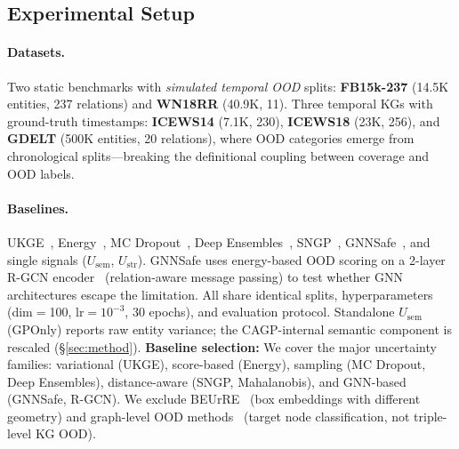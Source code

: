
\subsection{Experimental Setup}

\paragraph{Datasets.}
Two static benchmarks with \emph{simulated temporal OOD} splits: \textbf{FB15k-237} (14.5K entities, 237 relations) and \textbf{WN18RR} (40.9K, 11). Three temporal KGs with ground-truth timestamps: \textbf{ICEWS14} (7.1K, 230), \textbf{ICEWS18} (23K, 256), and \textbf{GDELT} (500K entities, 20 relations), where OOD categories emerge from chronological splits---breaking the definitional coupling between coverage and OOD labels.

\paragraph{Baselines.}
UKGE~\citep{chen2019embedding}, Energy~\citep{liu2020energy}, MC Dropout~\citep{gal2016dropout}, Deep Ensembles~\citep{lakshminarayanan2017simple}, SNGP~\citep{liu2020simple}, GNNSafe~\citep{wu2023energy}, and single signals ($U_{\text{sem}}$, $U_{\text{str}}$). GNNSafe uses energy-based OOD scoring on a 2-layer R-GCN encoder~\citep{schlichtkrull2018modeling} (relation-aware message passing) to test whether GNN architectures escape the limitation. All share identical splits, hyperparameters (dim$=$100, lr$=10^{-3}$, 30 epochs), and evaluation protocol. Standalone $U_{\text{sem}}$ (GPOnly) reports raw entity variance; the CAGP-internal semantic component is rescaled (\S\ref{sec:method}). \textbf{Baseline selection:} We cover the major uncertainty families: variational (UKGE), score-based (Energy), sampling (MC Dropout, Deep Ensembles), distance-aware (SNGP, Mahalanobis), and GNN-based (GNNSafe, R-GCN). We exclude BEUrRE~\citep{chen2021probabilistic} (box embeddings with different geometry) and graph-level OOD methods~\citep{gui2022good} (target node classification, not triple-level KG OOD).

